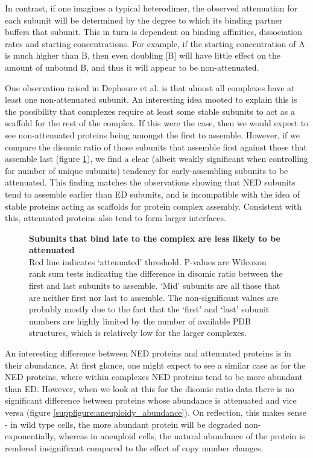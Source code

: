 \documentclass[a4paper,11pt,twoside,openright]{scrbook}
\begin{document}
In contrast, if one imagines a typical heterodimer, the observed attenuation for
each subunit will be determined by the degree to which its binding partner
buffers that subunit. This in turn is dependent on binding affinities,
dissociation rates and starting concentrations. For example, if the starting
concentration of A is much higher than B, then even doubling [B] will have
little effect on the amount of unbound B, and thus it will appear to be
non-attenuated.

One observation raised in Dephoure et al. is that almost all complexes have at
least one non-attenuated subunit. An interesting idea mooted to explain this is
the possibility that complexes require at least some stable subunits to act as a
scaffold for the rest of the complex. If this were the case, then we would
expect to see non-attenuated proteins being amongst the first to assemble.
However, if we compare the disomic ratio of those subunits that assemble first
against those that assemble last (figure \ref{figure:aneuploidy_assembly}), we
find a clear (albeit weakly significant when controlling for number of unique
subunits) tendency for early-assembling subunits to be attenuated. This finding
matches the observations showing that NED subunits tend to assemble earlier than
ED subunits, and is incompatible with the idea of stable proteins acting as
scaffolds for protein complex assembly. Consistent with this, attenuated
proteins also tend to form larger interfaces.

\begin{figure}[h]
    \caption[Subunits that bind late to the complex are less likely to be
    attenuated]{\sffamily \textbf{Subunits that bind late to the complex are
    less likely to be attenuated} \\ \small Red line indicates `attenuated'
    threshold. P-values are Wilcoxon rank sum tests indicating the difference in
    disomic ratio between the first and last subunits to assemble. `Mid'
    subunits are all those that are neither first nor last to assemble. The
    non-significant values are probably mostly due to the fact that the `first'
    and `last' subunit numbers are highly limited by the number of available PDB
    structures, which is relatively low for the larger complexes.}
    \label{figure:aneuploidy_assembly}
\end{figure}

An interesting difference between NED proteins and attenuated proteins is in
their abundance. At first glance, one might expect to see a similar case as for
the NED proteins, where within complexes NED proteins tend to be more abundant
than ED. However, when we look at this for the disomic ratio data there is no
significant difference between proteins whose abundance is attenuated and vice
versa (figure \ref{suppfigure:aneuploidy_abundance}). On reflection, this makes
sense - in wild type cells, the more abundant protein will be degraded
non-exponentially, whereas in aneuploid cells, the natural abundance of the
protein is rendered insignificant compared to the effect of copy number changes.
\end{document}
